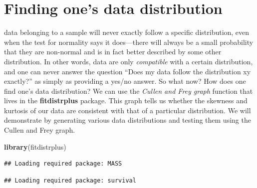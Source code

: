 \documentclass[english,10pt,a4paper,oneside]{book}
\newenvironment{Shaded}{\begin{snugshade}}{\end{snugshade}}
\newcommand{\KeywordTok}[1]{\textcolor[rgb]{0.13,0.29,0.53}{\textbf{#1}}}
\newcommand{\NormalTok}[1]{#1}
\theoremstyle{definition}
\theoremstyle{definition}
\theoremstyle{definition}
\theoremstyle{remark}
\begin{document}
\section{Finding one's data
distribution}\label{finding-ones-data-distribution}

data belonging to a sample will never exactly follow a specific
distribution, even when the test for normality says it does---there will
always be a small probability that they are non-normal and is in fact
better described by some other distribution. In other words, data are
only \emph{compatible} with a certain distribution, and one can never
answer the question \enquote{Does my data follow the distribution xy
exactly?} as simply as providing a yes/no answer. So what now? How does
one find one's data distribution? We can use the \emph{Cullen and Frey
graph} function that lives in the \textbf{fitdistrplus} package. This
graph tells us whether the skewness and kurtosis of our data are
consistent with that of a particular distribution. We will demonstrate
by generating various data distributions and testing them using the
Cullen and Frey graph.

\begin{Shaded}
\begin{Highlighting}[]
\KeywordTok{library}\NormalTok{(fitdistrplus)}
\end{Highlighting}
\end{Shaded}

\begin{verbatim}
## Loading required package: MASS
\end{verbatim}

\begin{verbatim}
## Loading required package: survival
\end{verbatim}
\end{document}
